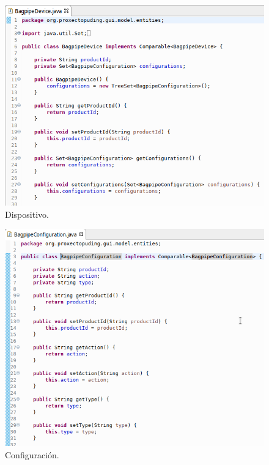    \begin{figure}[htbp]
    \centering
    \includegraphics[scale=0.6, keepaspectratio=true]{./imagenes/bagpipe-device.png}
    \caption{Dispositivo.}
    \label{figura:BagpipeDevice}
   \end{figure}
   
   \begin{figure}[htbp]
    \centering
    \includegraphics[scale=0.6, keepaspectratio=true]{./imagenes/bagpipe-configuration.png}
    \caption{Configuración.}
    \label{figura:BagpipeConfiguration}
   \end{figure}
   
